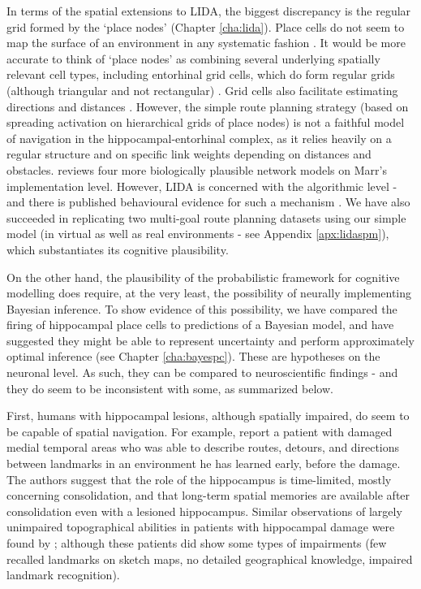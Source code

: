 In terms of the spatial extensions to LIDA, the biggest discrepancy is the regular grid formed by the `place nodes' (Chapter \ref{cha:lida}). Place cells do not seem to map the surface of an environment in any systematic fashion \citep{o1998place}. It would be more accurate to think of `place nodes' as combining several underlying spatially relevant cell types, including entorhinal grid cells, which do form regular grids (although triangular and not rectangular) \citep{moser2008place}. Grid cells also facilitate estimating directions and distances \citep{bush2015using}. However, the simple route planning strategy (based on spreading activation on hierarchical grids of place nodes) is not a faithful model of navigation in the hippocampal-entorhinal complex, as it relies heavily on a regular structure and on specific link weights depending on distances and obstacles. \cite{bush2015using} reviews four more biologically plausible network models on Marr's implementation level. However, LIDA is concerned with the algorithmic level - and there is published behavioural evidence for such a mechanism \citep{mueller2013pathfinding}. We have also succeeded in replicating two multi-goal route planning datasets using our simple model (in virtual as well as real environments - see Appendix \ref{apx:lidaspm}), which substantiates its cognitive plausibility. 

On the other hand, the plausibility of the probabilistic framework for cognitive modelling does require, at the very least, the possibility of neurally implementing Bayesian inference. To show evidence of this possibility, we have compared the firing of hippocampal place cells to predictions of a Bayesian model, and have suggested they might be able to represent uncertainty and perform approximately optimal inference (see Chapter \ref{cha:bayespc}). These are hypotheses on the neuronal level. As such, they can be compared to neuroscientific findings - and they do seem to be inconsistent with some, as summarized below.

First, humans with hippocampal lesions, although spatially impaired, do seem to be capable of spatial navigation. For example, \citep{teng1999} report a patient with damaged medial temporal areas who was able to describe routes, detours, and directions between landmarks in an environment he has learned early, before the damage. The authors suggest that the role of the hippocampus is time-limited, mostly concerning consolidation, and that long-term spatial memories are available after consolidation even with a lesioned hippocampus. Similar observations of largely unimpaired topographical abilities in patients with hippocampal damage were found by \citep{rosenbaum2000, rosenbaum2005}; although these patients did show some types of impairments (few recalled landmarks on sketch maps, no detailed geographical knowledge, impaired landmark recognition). 

